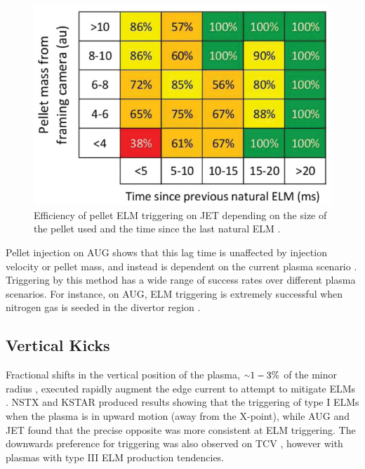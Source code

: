 \documentclass[11pt, twocolumn]{article}  %
\providecommand{\squiggle}{\raise.17ex\hbox{$\scriptstyle\sim$}} %
\begin{document}
\begin{figure}
\includegraphics[scale=0.45]{Figures/PI_ELMprob.png}
\centering
\caption{Efficiency of pellet ELM triggering on JET depending on the size of the pellet used and the time since the last natural ELM \cite{Baylor2015}.}\label{fig:PI_ELMprob}
\end{figure}

Pellet injection on AUG shows that this lag time is unaffected by injection velocity or pellet mass, and instead is dependent on the current plasma scenario \cite{Lang2014}. Triggering by this method has a wide range of success rates over different plasma scenarios. For instance, on AUG, ELM triggering is extremely successful when nitrogen gas is seeded in the divertor region \cite{Kallenbach2012}. 


\subsection{Vertical Kicks}\label{ssec:Vkicks}
Fractional shifts in the vertical position of the plasma, $\squiggle 1-3\%$ of the minor radius \cite{KirkFF}, executed rapidly augment the edge current to attempt to mitigate ELMs \cite{DelaLuna2016}. NSTX \cite{Gerhardt2010} and KSTAR \cite{Kim2012} produced results showing that the triggering of type I ELMs when the plasma is in upward motion (away from the X-point), while AUG \cite{Lang2004} and JET \cite{DelaLuna2016} found that the precise opposite was more consistent at ELM triggering. The downwards preference for triggering was also observed on TCV \cite{Degeling2003}, however with plasmas with type III ELM production tendencies.
\end{document}
